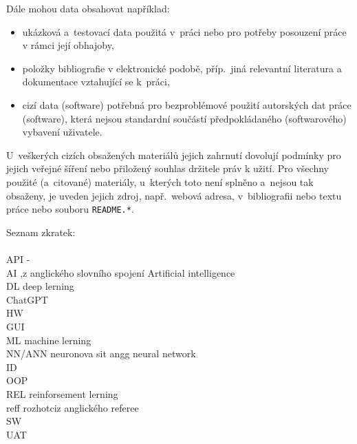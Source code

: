 \documentclass[
  program=ainfk,
  biblatex,
  language=czech,
  figures=true,
  tables ,
  sourcecodes=true,
  glossaries=true,
  index
]{kidiplom}
\begin{document}
Dále mohou data obsahovat například:

\begin{itemize}

\item
  ukázková a~testovací data použitá v~práci nebo pro potřeby posouzení
  práce v rámci její obhajoby,

\item
  položky bibliografie v elektronické podobě, příp.~jiná relevantní literatura
  a dokumentace vztahující se k~práci,

\item
  cizí data (software) potřebná pro bezproblémové použití autorských
  dat práce (software), která nejsou standardní součástí
  předpokládaného (softwarového) vybavení uživatele.

\end{itemize}

U~veškerých cizích obsažených materiálů jejich
zahrnutí dovolují podmínky pro jejich veřejné šíření nebo přiložený souhlas
držitele práv k užití. Pro všechny použité (a~citované) materiály,
u~kterých toto není splněno a~nejsou tak obsaženy, je uveden
jejich zdroj, např.~webová adresa, v~bibliografii nebo textu práce
nebo souboru \texttt{README.*}.





\printglossary

Seznam zkratek:\\
\\
API -                                  \\
AI ,z anglického slovního spojení Artificial intelligence                                   \\
DL deep lerning                                  \\
ChatGPT                                  \\
HW                                  \\
GUI                                  \\
ML machine lerning                                  \\
NN/ANN neuronova sit angg neural network                                   \\
ID        \\
OOP                     \\
REL reinforsement lerning                                  \\
reff  rozhotciz anglického referee                                  \\
SW                                               \\
UAT                                  \\
\end{document}
